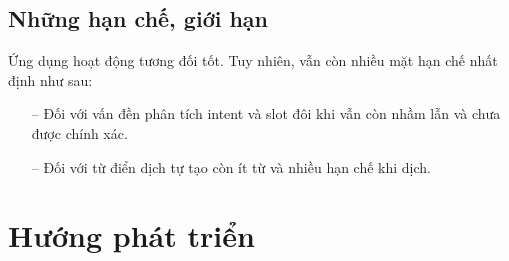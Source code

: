 
\subsection{Những hạn chế, giới hạn}
Ứng dụng hoạt động tương đối tốt. Tuy nhiên, vẫn còn nhiều mặt hạn chế nhất định như sau:
\begin{itemize}
    \item[--] Đối với vấn đền phân tích intent và slot đôi khi vẫn còn nhầm lẫn và chưa được chính xác.
    \item[--] Đối với từ điển dịch tự tạo còn ít từ và nhiều hạn chế khi dịch.
\end{itemize}

\section{Hướng phát triển}